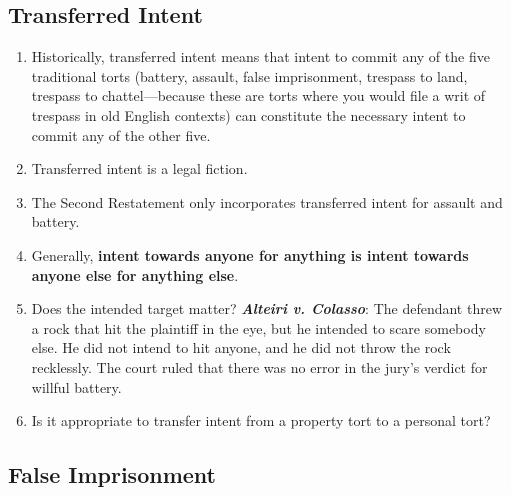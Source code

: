 \subsection{Transferred Intent}

\begin{enumerate}
    \item Historically, transferred intent means that intent to commit any of the five traditional torts (battery, assault, false imprisonment, trespass to land, trespass to chattel---because these are torts where you would file a writ of trespass in old English contexts) can constitute the necessary intent to commit any of the other five. 
    \item Transferred intent is a legal fiction.
    \item The Second Restatement only incorporates transferred intent for assault and battery.
    \item Generally, \textbf{intent towards anyone for anything is intent towards anyone else for anything else}.
    \item Does the intended target matter? \textbf{\emph{Alteiri v. Colasso}}:  The defendant threw a rock that hit the plaintiff in the eye, but he intended to scare somebody else. He did not intend to hit anyone, and he did not throw the rock recklessly. The court ruled that there was no error in the jury's verdict for willful battery.
    \item Is it appropriate to transfer intent from a property tort to a personal tort?
\end{enumerate}


\subsection{False Imprisonment}

